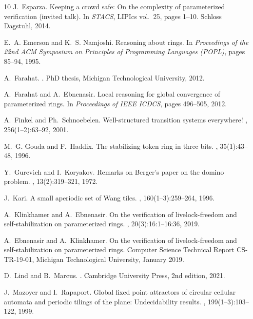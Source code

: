 \documentclass[11pt]{article}
\begin{document}
\begin{thebibliography}{10}
J.~Esparza.
\newblock Keeping a crowd safe: On the complexity of parameterized verification (invited talk).
\newblock In {\em STACS}, LIPIcs vol.~25, pages 1--10. Schloss Dagstuhl, 2014.

E.~A. Emerson and K.~S. Namjoshi.
\newblock Reasoning about rings.
\newblock In {\em Proceedings of the 22nd ACM Symposium on Principles of Programming Languages (POPL)}, pages 85--94, 1995.

A.~Farahat.
.
\newblock PhD thesis, Michigan Technological University, 2012.

A.~Farahat and A.~Ebnenasir.
\newblock Local reasoning for global convergence of parameterized rings.
\newblock In {\em Proceedings of IEEE ICDCS}, pages 496--505, 2012.

A.~Finkel and Ph.~Schnoebelen.
\newblock Well-structured transition systems everywhere!
, 256(1--2):63--92, 2001.

M.~G. Gouda and F.~Haddix.
\newblock The stabilizing token ring in three bits.
, 35(1):43--48, 1996.

Y.~Gurevich and I.~Koryakov.
\newblock Remarks on Berger's paper on the domino problem.
, 13(2):319--321, 1972.

J.~Kari.
\newblock A small aperiodic set of Wang tiles.
, 160(1--3):259--264, 1996.

A.~Klinkhamer and A.~Ebnenasir.
\newblock On the verification of livelock-freedom and self-stabilization on parameterized rings.
, 20(3):16:1--16:36, 2019.

A.~Ebnenasir and A.~Klinkhamer.
\newblock On the verification of livelock-freedom and self-stabilization on parameterized rings.
\newblock Computer Science Technical Report CS-TR-19-01, Michigan Technological University, January 2019.

D.~Lind and B.~Marcus.
.
\newblock Cambridge University Press, 2nd edition, 2021.

J.~Mazoyer and I.~Rapaport.
\newblock Global fixed point attractors of circular cellular automata and periodic tilings of the plane: Undecidability results.
, 199(1--3):103--122, 1999.


\end{thebibliography}
\end{document}
